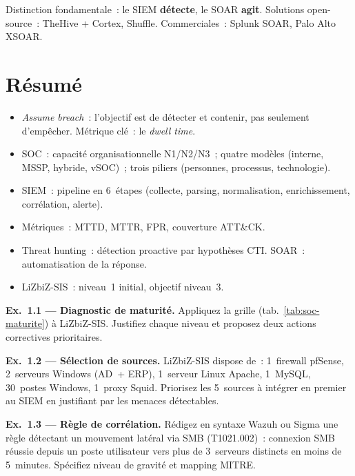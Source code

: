 Distinction fondamentale~: le SIEM \textbf{détecte}, le SOAR \textbf{agit}.
Solutions open-source~: TheHive + Cortex, Shuffle. Commerciales~: Splunk SOAR,
Palo Alto XSOAR.

\section*{Résumé}

\begin{boxresume}
\begin{itemize}
  \item \textit{Assume breach}~: l'objectif est de détecter et contenir,
        pas seulement d'empêcher. Métrique clé~: le \textit{dwell time}.
  \item SOC~: capacité organisationnelle N1/N2/N3~; quatre modèles
        (interne, MSSP, hybride, vSOC)~; trois piliers (personnes,
        processus, technologie).
  \item SIEM~: pipeline en 6~étapes (collecte, parsing, normalisation,
        enrichissement, corrélation, alerte).
  \item Métriques~: MTTD, MTTR, FPR, couverture ATT\&CK.
  \item Threat hunting~: détection proactive par hypothèses CTI.
        SOAR~: automatisation de la réponse.
  \item LiZbiZ-SIS~: niveau~1 initial, objectif niveau~3.
\end{itemize}
\end{boxresume}

\begin{boxexo}
\textbf{Ex.~1.1 — Diagnostic de maturité.}
Appliquez la grille (tab.~\ref{tab:soc-maturite}) à LiZbiZ-SIS.
Justifiez chaque niveau et proposez deux actions correctives prioritaires.

\medskip\textbf{Ex.~1.2 — Sélection de sources.}
LiZbiZ-SIS dispose de~: 1~firewall pfSense, 2~serveurs Windows
(AD~+ ERP), 1~serveur Linux Apache, 1~MySQL, 30~postes Windows,
1~proxy Squid. Priorisez les 5~sources à intégrer en premier au SIEM
en justifiant par les menaces détectables.

\medskip\textbf{Ex.~1.3 — Règle de corrélation.}
Rédigez en syntaxe Wazuh ou Sigma une règle détectant un mouvement
latéral via SMB (T1021.002)~: connexion SMB réussie depuis un poste
utilisateur vers plus de 3~serveurs distincts en moins de 5~minutes.
Spécifiez niveau de gravité et mapping MITRE.
\end{boxexo}
